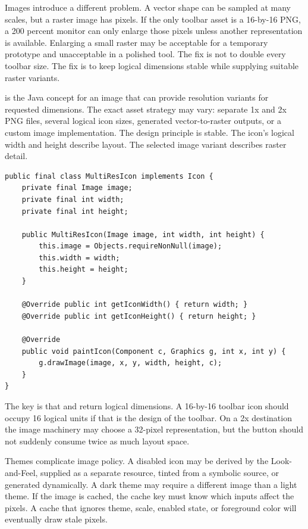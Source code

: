 Images introduce a different problem. A vector shape can be sampled at many scales, but a raster image has pixels. If the only toolbar asset is a 16-by-16 PNG, a 200 percent monitor can only enlarge those pixels unless another representation is available. Enlarging a small raster may be acceptable for a temporary prototype and unacceptable in a polished tool. The fix is not to double every toolbar size. The fix is to keep logical dimensions stable while supplying suitable raster variants.

 is the Java concept for an image that can provide resolution variants for requested dimensions. The exact asset strategy may vary: separate 1x and 2x PNG files, several logical icon sizes, generated vector-to-raster outputs, or a custom image implementation. The design principle is stable. The icon's logical width and height describe layout. The selected image variant describes raster detail.

\begin{lstlisting}[caption={A small icon wrapper around a multi-resolution image.}]
public final class MultiResIcon implements Icon {
    private final Image image;
    private final int width;
    private final int height;

    public MultiResIcon(Image image, int width, int height) {
        this.image = Objects.requireNonNull(image);
        this.width = width;
        this.height = height;
    }

    @Override public int getIconWidth() { return width; }
    @Override public int getIconHeight() { return height; }

    @Override
    public void paintIcon(Component c, Graphics g, int x, int y) {
        g.drawImage(image, x, y, width, height, c);
    }
}
\end{lstlisting}

The key is that  and  return logical dimensions. A 16-by-16 toolbar icon should occupy 16 logical units if that is the design of the toolbar. On a 2x destination the image machinery may choose a 32-pixel representation, but the button should not suddenly consume twice as much layout space.

Themes complicate image policy. A disabled icon may be derived by the Look-and-Feel, supplied as a separate resource, tinted from a symbolic source, or generated dynamically. A dark theme may require a different image than a light theme. If the image is cached, the cache key must know which inputs affect the pixels. A cache that ignores theme, scale, enabled state, or foreground color will eventually draw stale pixels.

